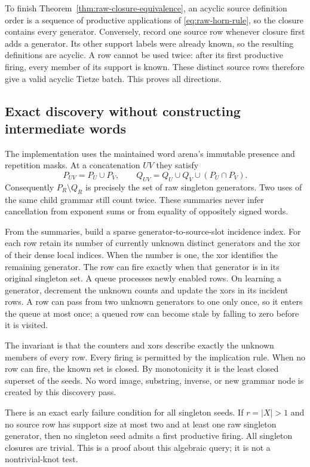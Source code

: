 To finish Theorem~\ref{thm:raw-closure-equivalence}, an acyclic source
definition order is a sequence of productive applications of
\eqref{eq:raw-horn-rule}, so the closure contains every generator.
Conversely, record one source row whenever closure first adds a generator.
Its other support labels were already known, so the resulting definitions
are acyclic. A row cannot be used twice: after its first productive firing,
every member of its support is known. These distinct source rows therefore
give a valid acyclic Tietze batch. This proves all directions.

\subsection{Exact discovery without constructing intermediate words}

The implementation uses the maintained word arena's immutable presence and
repetition masks. At a concatenation $UV$ they satisfy
\[
 P_{UV}=P_U\cup P_V,\qquad
 Q_{UV}=Q_U\cup Q_V\cup(P_U\cap P_V).
\]
Consequently $P_R\setminus Q_R$ is precisely the set of raw singleton
generators. Two uses of the same child grammar still count twice. These
summaries never infer cancellation from exponent sums or from equality of
oppositely signed words.

From the summaries, build a sparse generator-to-source-slot incidence
index. For each row retain its number of currently unknown distinct
generators and the xor of their dense local indices. When the number is
one, the xor identifies the remaining generator. The row can fire exactly
when that generator is in its original singleton set. A queue processes
newly enabled rows. On learning a generator, decrement the unknown counts
and update the xors in its incident rows. A row can pass from two unknown
generators to one only once, so it enters the queue at most once; a queued
row can become stale by falling to zero before it is visited.

The invariant is that the counters and xors describe exactly the unknown
members of every row. Every firing is permitted by the implication rule.
When no row can fire, the known set is closed. By monotonicity it is the
least closed superset of the seeds. No word image, substring, inverse, or
new grammar node is created by this discovery pass.

There is an exact early failure condition for all singleton seeds. If
$r=|X|>1$ and no source row has support size at most two and at least one
raw singleton generator, then no singleton seed admits a first productive
firing. All singleton closures are trivial. This is a proof about this
algebraic query; it is not a nontrivial-knot test.

